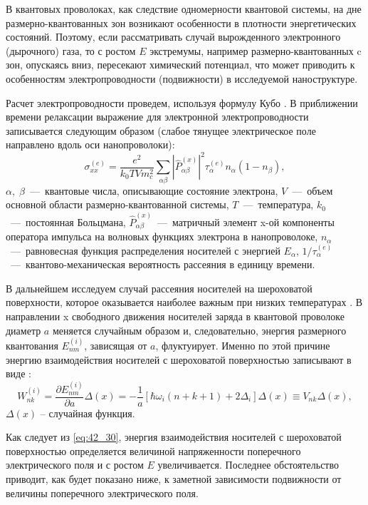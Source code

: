 В квантовых проволоках, как следствие одномерности квантовой системы, на дне размерно-квантованных зон возникают особенности в плотности энергетических состояний. Поэтому, если рассматривать случай вырожденного электронного (дырочного) газа, то с ростом $E$ экстремумы, например размерно-квантованных c зон, опускаясь вниз, пересекают химический потенциал, что может приводить к особенностям электропроводности (подвижности) в исследуемой наноструктуре.

Расчет электропроводности проведем, используя формулу Кубо \cite{Kubo1957a}. В приближении времени релаксации \cite{Khamidullin2002} выражение для электронной электропроводности записывается следующим образом (слабое тянущее электрическое поле направлено вдоль оси нанопроволоки):
\begin{equation} \label{eq:42_20}
\sigma _{xx}^{(e)} =\frac{e^2 }{k_0 TVm_c^2 } \sum _{\alpha \beta }\left|\hat{P}_{\alpha \beta }^{(x)} \right|^2 \tau _{\alpha }^{(e)} n_{\alpha } \left(1-n_{\beta } \right),
\end{equation} 
$\alpha ,\; \beta $~---~квантовые числа, описывающие состояние электрона, $V$~---~объем основной области размерно-квантованной системы, $T$~---~температура, $k_0 $~---~постоянная Больцмана, $\hat{P}_{\alpha \beta }^{(x)} $~---~матричный элемент x-ой компоненты оператора импульса на волновых функциях электрона в нанопроволоке, $n_{\alpha } $~---~равновесная функция распределения носителей с энергией $E_{\alpha } $, $ 1 / \tau_{\alpha}^{(e)} $~---~квантово-механическая вероятность рассеяния в единицу времени.

В дальнейшем исследуем случай рассеяния носителей на шероховатой поверхности, которое оказывается наиболее важным при низких температурах \cite{Sakaki1987,Vurgaftman1999}. В направлении x свободного движения носителей заряда в квантовой проволоке диаметр $a$ меняется случайным образом и, следовательно, энергия размерного квантования $E_{nm}^{(i)} $, зависящая от $a$, флуктуирует. Именно по этой причине энергию взаимодействия носителей с шероховатой поверхностью записывают в виде \cite{Sakaki1987}:
\begin{equation} \label{eq:42_30}
W_{nk}^{(i)} =\frac{\partial E_{nm}^{(i)} }{\partial a} \Delta (x)=-\frac{1}{a} \left[\hbar \omega_i \left(n+k+1\right)+2\Delta_i \right]\Delta (x)\equiv V_{nk} \Delta (x),
\end{equation}  
$\Delta (x)$ -- случайная функция.

Как следует из \eqref{eq:42_30}, энергия взаимодействия носителей с шероховатой поверхностью определяется величиной напряженности поперечного электрического поля и с ростом $E$ увеличивается. Последнее обстоятельство приводит, как будет показано ниже, к заметной зависимости подвижности от величины поперечного электрического поля.


